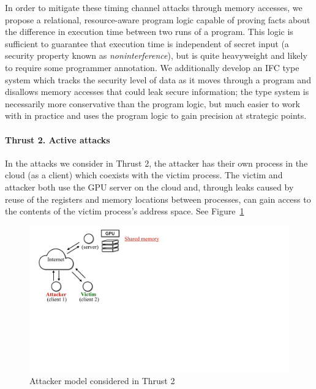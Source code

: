 In order to mitigate these timing channel attacks through memory accesses, we propose a relational, resource-aware program logic capable of proving facts about the difference in execution time between two runs of a program.
%
This logic is sufficient to guarantee that execution time is independent of secret input (a security property known as {\em noninterference}), but is quite heavyweight and likely to require some programmer annotation.
%
We additionally develop an IFC type system which tracks the security level of data as it moves through a program and disallows memory accesses that could leak secure information; the type system is necessarily more conservative than the program logic, but much easier to work with in practice and uses the program logic to gain precision at strategic points.

\paragraph{Thrust 2. Active attacks}
In the attacks we consider in Thrust 2, the attacker has their own process in the cloud (as a client) which coexists with the victim process.
%
The victim and attacker both use the GPU server on the cloud and, through leaks caused by reuse of the registers and memory locations between processes, can gain access to the contents of the victim process's address space.
%
See Figure~\ref{fig:th2-attack}

\begin{figure}[h]
    \centering
    \includegraphics[clip,trim=0 17cm 10cm 0cm,width=0.72\pdfpagewidth]{figs/thrust2-fig.pdf}
    \caption{Attacker model considered in Thrust 2 }
    \label{fig:th2-attack}
\end{figure}



